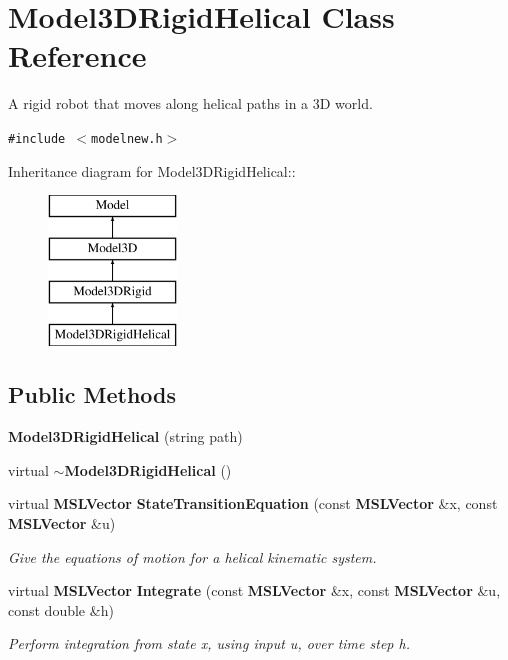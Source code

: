 \section{Model3DRigid\-Helical  Class Reference}
\label{class_Model3DRigidHelical}
A rigid robot that moves along helical paths in a 3D world. 


{\tt \#include $<$modelnew.h$>$}

Inheritance diagram for Model3DRigid\-Helical::\begin{figure}[H]
\begin{center}
\leavevmode
\includegraphics[height=4cm]{class_Model3DRigidHelical}
\end{center}
\end{figure}
\subsection*{Public Methods}
\begin{CompactItemize}
\item 
{\bf Model3DRigid\-Helical} (string path)
\item 
virtual {\bf $\sim$Model3DRigid\-Helical} ()
\item 
virtual {\bf MSLVector} {\bf State\-Transition\-Equation} (const {\bf MSLVector} \&x, const {\bf MSLVector} \&u)
\begin{CompactList}\small\item\em Give the equations of motion for a helical kinematic system.\item\end{CompactList}\item 
virtual {\bf MSLVector} {\bf Integrate} (const {\bf MSLVector} \&x, const {\bf MSLVector} \&u, const double \&h)
\begin{CompactList}\small\item\em Perform integration from state x, using input u, over time step h.\item\end{CompactList}\end{CompactItemize}


